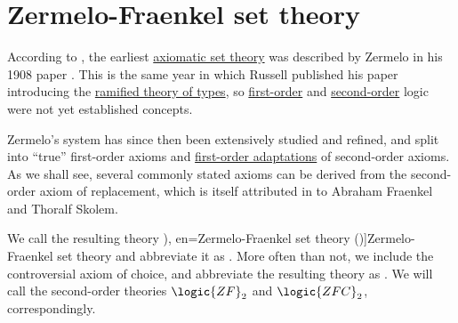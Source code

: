 \section{Zermelo-Fraenkel set theory}\label{sec:zermelo_fraenkel_set_theory}

\begin{definition}\label{def:zfc}
  According to \cite[40]{Kleene1971Metamathematics}, the earliest \hyperref[def:axiomatic_set_theory]{axiomatic set theory} was described by Zermelo in his 1908 paper \cite{Zermelo2010Collection:GrundlagenDerMengenlehre}. This is the same year in which Russell published his paper \cite{Russell1908TypeTheory} introducing the \hyperref[def:ramified_theory_of_types]{ramified theory of types}, so \hyperref[def:first_order_logic]{first-order} and \hyperref[def:second_order_logic]{second-order} logic were not yet established concepts.

  Zermelo's system has since then been extensively studied and refined, and split into \enquote{true} first-order axioms and \hyperref[def:fol_adaptation_of_monadic_sol_theory]{first-order adaptations} of second-order axioms. As we shall see, several commonly stated axioms can be derived from the second-order axiom of replacement, which is itself attributed in \cite[15]{Jech2006SetTheory} to Abraham Fraenkel and Thoralf Skolem.

  We call the resulting theory \term[ru=теория множеств Цермело-Френкеля (\cite[179]{Герасимов2014Вычислимость}), en=Zermelo-Fraenkel set theory (\cite[\S 5.3.2]{Mimram2020ProgramEqualsProof})]{Zermelo-Fraenkel set theory} and abbreviate it as . More often than not, we include the controversial axiom of choice, and abbreviate the resulting theory as . We will call the second-order theories \( \logic{ZF}_2 \) and \( \logic{ZFC}_2 \), correspondingly.


\end{definition}
